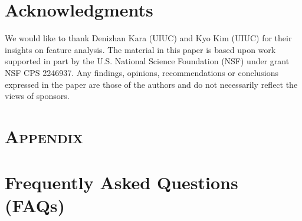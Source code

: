 \documentclass[manuscript]{acmart}
\begin{document}
 \section*{Acknowledgments}
{We would like to thank Denizhan Kara (UIUC) and Kyo Kim (UIUC) for their insights on feature analysis. The material in this paper is based upon work supported in part by the U.S. National Science Foundation (NSF) under grant NSF CPS 2246937. Any findings, opinions, recommendations or conclusions expressed in the paper are those of the authors and do not necessarily reflect the views of sponsors.}
 
\balance

\clearpage 
\setcounter{section}{0}

\section*{\huge{\textsc{Appendix}}}
\label{sec:appendix}



\section{Frequently Asked Questions (FAQs)}
\label{sec:app}
\end{document}
